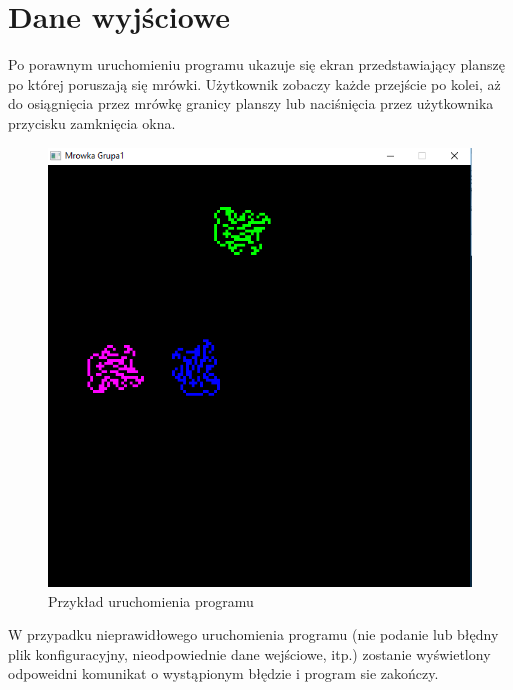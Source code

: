 \documentclass{article}
\begin{document}
\section{Dane wyjściowe}
Po porawnym uruchomieniu programu ukazuje się ekran przedstawiający planszę po której poruszają się mrówki. Użytkownik zobaczy każde przejście po kolei, aż do osiągnięcia przez mrówkę granicy planszy lub naciśnięcia przez użytkownika przycisku zamknięcia okna.

\begin{figure}[ht]
\centering
\includegraphics[scale=0.4]{przykladUruch}
\caption{Przykład uruchomienia programu}
\label{fig:przykladUruch}
\end{figure}

W przypadku nieprawidłowego uruchomienia programu (nie podanie lub błędny plik konfiguracyjny, nieodpowiednie dane wejściowe, itp.) zostanie wyświetlony odpoweidni komunikat o wystąpionym błędzie i program sie zakończy. 
\end{document}
